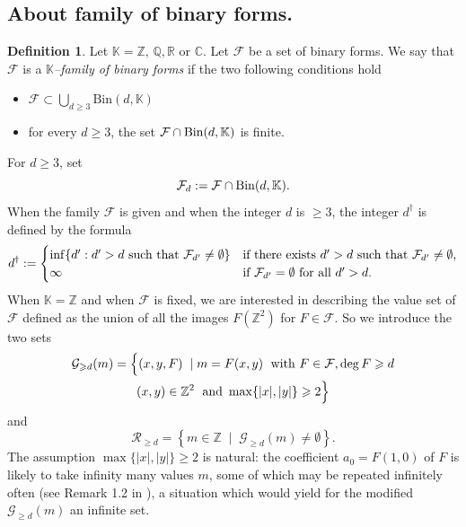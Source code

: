 \documentclass[10pt]{article}
\theoremstyle{definition}
\newtheorem{definition}[theorem]{Definition}
\numberwithin{equation}{section}
\newcommand {\Q}{{\mathbb{Q}}}
\newcommand {\C}{{\mathbb{C}}}
\newcommand {\R}{{\mathbb{R}}}
\newcommand {\Z}{{\mathbb{Z}}}
\newcommand {\K}{{\mathbb{K}}}
\newcommand{\Bin}{\mathrm {Bin}}
\newcommand{\calF}{\mathcal {F}}
\newcommand{\calG}{\mathcal {G}}
\newcommand{\calR}{\mathcal {R}}
\begin{document}
 
 \subsection{About family of binary forms.}
 
 \begin{definition} \label{defFamily}
 Let $\K = \Z,\, \Q, \R$ or $\C$. Let $\mathcal F$ be a set of binary forms. We say that $\mathcal F$ is a {\it $\K$--family of binary forms} 
 if the two following conditions hold \begin{itemize}
 \item $\mathcal F \subset \bigcup_{d\geqslant 3} \Bin (d, \K)$ 
 \item for every $d\geqslant 3$, the set $\mathcal F \cap {\rm Bin }( d, \K) $ is finite.
 \end{itemize}
 \end{definition}
 For $d\geqslant 3$, set 
 \begin{equation}\label{defFd}\mathcal F_d:= \mathcal F \cap {\rm Bin }( d, \K).
 \end{equation} When the family $\calF$ is given and when the integer $d$ is $\geqslant 3$, 
the integer $d^\dag$ is defined by the formula
\[
d^\dag :=
\begin{cases}
\inf\{ d' : d' >d \text{ such that } \calF_{d'} \ne \emptyset\}
&\hbox{if there exists $d'>d$ such that $\calF_{d'} \ne \emptyset$,}
\\
\infty
& \hbox{if $\calF_{d'} = \emptyset$ for all $d'>d$.}
\end{cases}
\] 
When $\K= \Z$ and when $\mathcal F$ is fixed, we are interested in describing the value set of $\mathcal F$ defined as the union of all the images $F (\Z^2)$ for $F\in\mathcal F$. So 
we introduce the two sets 
\begin{multline} \label{defCalG}
\calG_{\geqslant d}(m)=
\Big\{(x,y,F)\;
 \mid
m=F(x,y)\; \hbox{ with } 
 F\in \mathcal F, \deg F \geqslant d \\ (x,y)\in\Z^2 \; \hbox{ and } 
 \max\{|x|,|y|\}\geqslant 2 \Big\}
 \end{multline}
 and 
\[
\calR_{\geqslant d}=\left\{m\in\Z\; \mid\; \calG_{\geqslant d}(m)\not=\emptyset \right\}.
\]
The assumption $\max\{|x|,|y|\}\geqslant 2$ is natural: the coefficient $a_0=F(1,0)$ of $F$ is likely to take infinity many values $m$, some of which may be repeated infinitely often 
(see Remark 1.2 in \cite{FW2}), a situation which would yield for the modified $\calG_{\geqslant d}(m)$ an infinite set.
 
\end{document}
